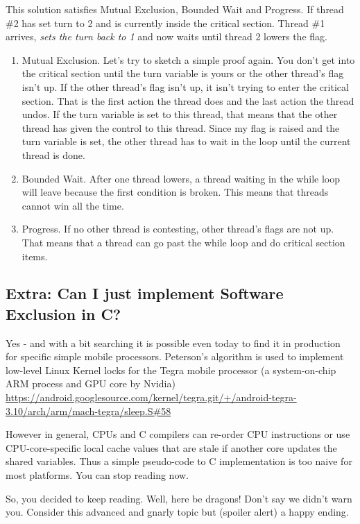This solution satisfies Mutual Exclusion, Bounded Wait and Progress.
If thread \#2 has set turn to 2 and is currently inside the critical section.
Thread \#1 arrives, \emph{sets the turn back to 1} and now waits until thread 2 lowers the flag.

\begin{enumerate}
\item Mutual Exclusion. Let's try to sketch a simple proof again.
  You don't get into the critical section until the turn variable is yours or the other thread's flag isn't up.
  If the other thread's flag isn't up, it isn't trying to enter the critical section.
  That is the first action the thread does and the last action the thread undos.
  If the turn variable is set to this thread, that means that the other thread has given the control to this thread.
  Since my flag is raised and the turn variable is set, the other thread has to wait in the loop until the current thread is done.
\item Bounded Wait. After one thread lowers, a thread waiting in the while loop will leave because the first condition is broken. This means that threads cannot win all the time.
\item Progress. If no other thread is contesting, other thread's flags are not up. That means that a thread can go past the while loop and do critical section items.
\end{enumerate}

\subsection{Extra: Can I just implement Software Exclusion in C?}

Yes - and with a bit searching it is possible even today to find it in production for specific simple mobile processors.
Peterson's algorithm is used to implement low-level Linux Kernel locks for the Tegra mobile processor (a system-on-chip ARM process and GPU core by Nvidia) \href{Link to Lock Source}{https://android.googlesource.com/kernel/tegra.git/+/android-tegra-3.10/arch/arm/mach-tegra/sleep.S\#58}

However in general, CPUs and C compilers can re-order CPU instructions or use CPU-core-specific local cache values that are stale if another core updates the shared variables.
Thus a simple pseudo-code to C implementation is too naive for most platforms.
You can stop reading now.

So, you decided to keep reading.
Well, here be dragons!
Don't say we didn't warn you.
Consider this advanced and gnarly topic but (spoiler alert) a happy ending.

